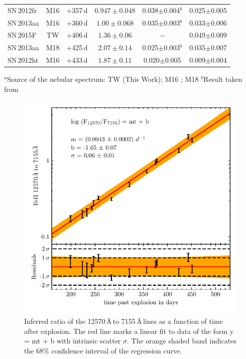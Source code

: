 \documentclass[fleqn,usenatbib]{mnras}
\begin{document}
\begin{table}
\begin{tabular}{lclccc}
        SN\,2012fr  & M16 & +357\,d & $0.947\pm0.048$ & 0.038$\pm$0.004$^b$ & 0.025$\pm$0.005\\
    	SN\,2013aa  & M16 & +360\,d & $1.00\pm0.068$ & 0.035$\pm$0.003$^b$ & 0.033$\pm$0.006\\
        SN\,2015F   & TW & +406\,d & $1.36\pm0.06$ & $-$ & 0.049$\pm$0.009\\
        SN\,2013aa  & M18 & +425\,d & $2.07\pm0.14$ & 0.025$\pm$0.003$^b$ & 0.035$\pm$0.007\\
        SN\,2012ht  & M16 & +433\,d & $1.87\pm0.11$ & 0.020$\pm$0.005 & 0.009$\pm$0.004\\
		\hline
	\end{tabular}
	\begin{flushleft}
         $^a$Source of the nebular spectrum: TW (This Work); M16 \citep{2016MNRAS.457.3254M}; M18 \citep{2018MNRAS.477.3567M}
         $^b$Result taken from \citet{2018A&A...620A.200F}
    \end{flushleft}
\end{table}
\begin{figure}
	\includegraphics[width=\linewidth]{plots/FeII_NIR_VIS_Ratio.pdf}
    \caption{Inferred ratio of the  12570\,\AA\,to 7155\,\AA\,lines as a function of time after explosion. The red line marks a linear fit to data of the form y = mt + b with intrinsic scatter $\sigma$. The orange shaded band indicates the $68\%$ confidence interval of the regression curve.}
    \label{FigureRatioNIR_VIS}
\end{figure}
\end{document}

